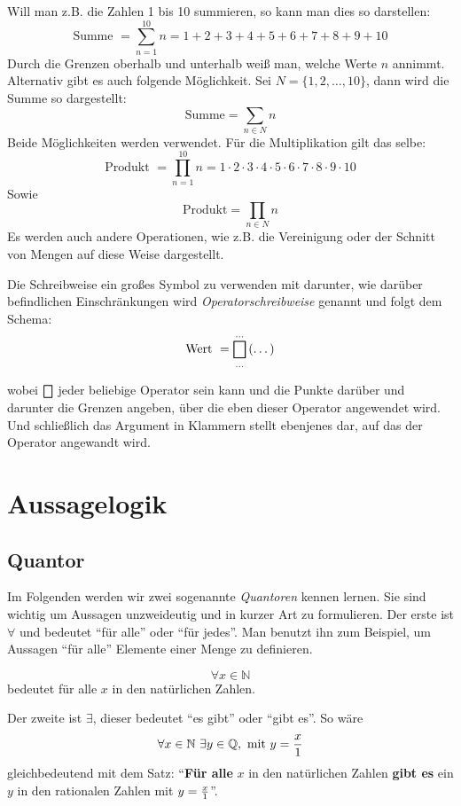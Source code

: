 Will man z.B. die Zahlen 1 bis 10 summieren, so kann man dies so darstellen:
\[ \text{Summe } = \sum_{n=1}^{10} n = 1+2+3+4+5+6+7+8+9+10 \]
Durch die Grenzen oberhalb und unterhalb weiß man, welche Werte $n$ annimmt. Alternativ gibt es auch folgende Möglichkeit. Sei $N = \{ 1,2, \dots ,10 \}$, dann wird die Summe so dargestellt:
\[ \text{Summe} = \sum_{n\in N} n \]
Beide Möglichkeiten werden verwendet. 
Für die Multiplikation gilt das selbe:
\[ \text{Produkt } = \prod_{n=1}^{10} n = 1\cdot 2\cdot 3\cdot 4\cdot 5\cdot 6\cdot 7\cdot 8\cdot 9\cdot 10 \]
Sowie
\[ \text{Produkt} = \prod_{n\in N} n  \]
Es werden auch andere Operationen, wie z.B. die Vereinigung oder der Schnitt von Mengen auf diese Weise dargestellt. 
\begin{definition}
Die Schreibweise ein großes Symbol zu verwenden mit darunter, wie darüber befindlichen Einschränkungen wird \emph{Operatorschreibweise} genannt und folgt dem Schema:
 \[ \text{Wert } = \bigbox_{\dots}^{\dots}\left( \dots \right) \]
\end{definition}
wobei $\bigbox$ jeder beliebige Operator sein kann und die Punkte darüber und darunter die Grenzen angeben, über die eben dieser Operator angewendet wird. Und schließlich das Argument in Klammern stellt ebenjenes dar, auf das der Operator angewandt wird. 

\section{Aussagelogik}

\subsection{Quantor}

Im Folgenden werden wir zwei sogenannte \emph{Quantoren}  kennen lernen. Sie sind wichtig um Aussagen unzweideutig und in kurzer Art zu formulieren. Der erste ist $\forall$ und bedeutet "`für alle"' oder "`für jedes"'. Man benutzt ihn zum Beispiel, um Aussagen "`für alle"' Elemente einer Menge zu definieren.

\[ \forall x\in \mathbb{N} \]
bedeutet für alle $x$ in den natürlichen Zahlen.

Der zweite ist $\exists$, dieser bedeutet "`es gibt"'  oder "`gibt es"'. So wäre 
\[ \forall x\in \mathbb{N}\ \exists y\in \mathbb{Q},\text{ mit }  y={x\over 1} \]
gleichbedeutend mit dem Satz: "`\textbf{Für alle} $x$ in den natürlichen Zahlen \textbf{gibt es} ein $y$ in den rationalen Zahlen mit $y={x \over 1}$"'.

